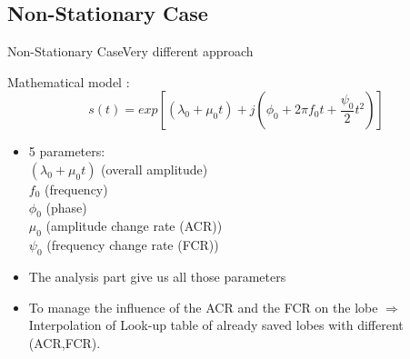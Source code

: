 \documentclass{bredelebeamer}
\begin{document}
\subsection{Non-Stationary Case}
\begin{frame}{Non-Stationary Case}{Very different approach}

\begin{block}{}
Mathematical model : \\

\begin{equation}
s(t) = exp[(\lambda_0 + \mu_0 t) + j(\phi_0 + 2\pi f_0 t + \frac{\psi_0}2 t^2 )]
\end{equation}
\end{block}
\begin{itemize}
\item 5 parameters: \\ $(\lambda_0 + \mu_0 t)$ (overall amplitude)\\ $f_0$ (frequency)\\ $\phi_0$ (phase) \\ $ \mu_0$ (amplitude change rate (ACR))\\ $\psi_0$ (frequency change rate (FCR))
\item The analysis part give us all those parameters
\item To manage the influence of the ACR and the FCR on the lobe $\Rightarrow$ Interpolation of Look-up table of already saved lobes with different (ACR,FCR).
\end{itemize}

\end{frame}
\end{document}

